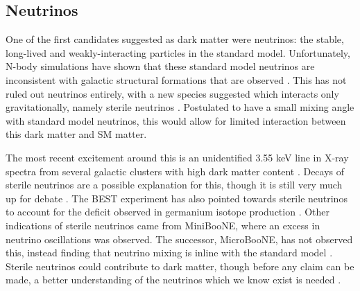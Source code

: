 \subsection{Neutrinos}
\par
One of the first candidates suggested as dark matter were neutrinos: the stable, long-lived and weakly-interacting particles in the standard model.
Unfortunately, N-body simulations have shown that these standard model neutrinos are inconsistent with galactic structural formations that are observed \cite{neutrinos_and_galaxy_clustering_ref}. 
This has not ruled out neutrinos entirely, with a new species suggested which interacts only gravitationally, namely sterile neutrinos \cite{sterile_neutrinos_ref}.
Postulated to have a small mixing angle with standard model neutrinos, this would allow for limited interaction between this dark matter and SM matter.
\par
The most recent excitement around this is an unidentified 3.55 keV line in X-ray spectra from several galactic clusters with high dark matter content \cite{sterile_neutrino_xray_decay_ref}.
Decays of sterile neutrinos are a possible explanation for this, though it is still very much up for debate \cite{xray_from_sterile_neutrons_2_ref, xray_from_sterile_neutrons_3_ref}.
The BEST experiment has also pointed towards sterile neutrinos to account for the deficit observed in germanium isotope production \cite{best_sterile_neutrino_result_ref,best_sterile_neutrino_2_ref}.
Other indications of sterile neutrinos came from MiniBooNE, where an excess in neutrino oscillations was observed.
The successor, MicroBooNE, has not observed this, instead finding that neutrino mixing is inline with the standard model \cite{miniboone_and_microboone_sterile_neutrino_ref}.
Sterile neutrinos could contribute to dark matter, though before any claim can be made, a better understanding of the neutrinos which we know exist is needed \cite{sterile_neutrino_as_dm_ref, sterile_neutrinos_dm_ref}.

